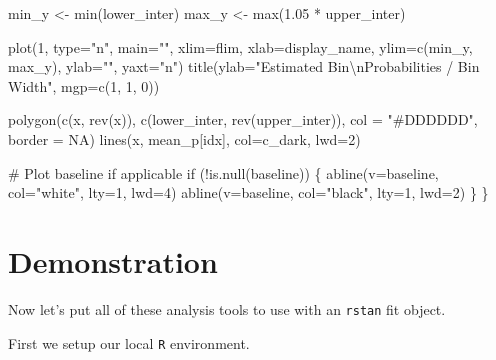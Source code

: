 \documentclass[
  letterpaper,
  DIV=11,
  numbers=noendperiod]{scrartcl}
\newenvironment{Shaded}{\begin{snugshade}}{\end{snugshade}}
\newcommand{\BuiltInTok}[1]{\textcolor[rgb]{0.00,0.23,0.31}{#1}}
\newcommand{\CharTok}[1]{\textcolor[rgb]{0.13,0.47,0.30}{#1}}
\newcommand{\CommentTok}[1]{\textcolor[rgb]{0.37,0.37,0.37}{#1}}
\newcommand{\ControlFlowTok}[1]{\textcolor[rgb]{0.00,0.23,0.31}{#1}}
\newcommand{\DecValTok}[1]{\textcolor[rgb]{0.68,0.00,0.00}{#1}}
\newcommand{\FloatTok}[1]{\textcolor[rgb]{0.68,0.00,0.00}{#1}}
\newcommand{\KeywordTok}[1]{\textcolor[rgb]{0.00,0.23,0.31}{#1}}
\newcommand{\NormalTok}[1]{\textcolor[rgb]{0.00,0.23,0.31}{#1}}
\newcommand{\OperatorTok}[1]{\textcolor[rgb]{0.37,0.37,0.37}{#1}}
\newcommand{\StringTok}[1]{\textcolor[rgb]{0.13,0.47,0.30}{#1}}
\begin{document}
\begin{Shaded}
\begin{Highlighting}[]
\NormalTok{  min\_y }\OperatorTok{\textless{}{-}} \BuiltInTok{min}\NormalTok{(lower\_inter)}
\NormalTok{  max\_y }\OperatorTok{\textless{}{-}} \BuiltInTok{max}\NormalTok{(}\FloatTok{1.05} \OperatorTok{*}\NormalTok{ upper\_inter)}
  
\NormalTok{  plot(}\DecValTok{1}\NormalTok{, }\BuiltInTok{type}\OperatorTok{=}\StringTok{"n"}\NormalTok{, main}\OperatorTok{=}\StringTok{""}\NormalTok{,}
\NormalTok{       xlim}\OperatorTok{=}\NormalTok{flim, xlab}\OperatorTok{=}\NormalTok{display\_name,}
\NormalTok{       ylim}\OperatorTok{=}\NormalTok{c(min\_y, max\_y), ylab}\OperatorTok{=}\StringTok{""}\NormalTok{, yaxt}\OperatorTok{=}\StringTok{"n"}\NormalTok{)}
\NormalTok{  title(ylab}\OperatorTok{=}\StringTok{"Estimated Bin}\CharTok{\textbackslash{}n}\StringTok{Probabilities / Bin Width"}\NormalTok{, mgp}\OperatorTok{=}\NormalTok{c(}\DecValTok{1}\NormalTok{, }\DecValTok{1}\NormalTok{, }\DecValTok{0}\NormalTok{))}
  
\NormalTok{  polygon(c(x, rev(x)), c(lower\_inter, rev(upper\_inter)),}
\NormalTok{          col }\OperatorTok{=} \StringTok{"\#DDDDDD"}\NormalTok{, border }\OperatorTok{=}\NormalTok{ NA)}
\NormalTok{  lines(x, mean\_p[idx], col}\OperatorTok{=}\NormalTok{c\_dark, lwd}\OperatorTok{=}\DecValTok{2}\NormalTok{)}
  
  \CommentTok{\# Plot baseline if applicable}
  \ControlFlowTok{if}\NormalTok{ (}\OperatorTok{!}\KeywordTok{is}\NormalTok{.null(baseline)) \{}
\NormalTok{    abline(v}\OperatorTok{=}\NormalTok{baseline, col}\OperatorTok{=}\StringTok{"white"}\NormalTok{, lty}\OperatorTok{=}\DecValTok{1}\NormalTok{, lwd}\OperatorTok{=}\DecValTok{4}\NormalTok{)}
\NormalTok{    abline(v}\OperatorTok{=}\NormalTok{baseline, col}\OperatorTok{=}\StringTok{"black"}\NormalTok{, lty}\OperatorTok{=}\DecValTok{1}\NormalTok{, lwd}\OperatorTok{=}\DecValTok{2}\NormalTok{)}
\NormalTok{  \}}
\NormalTok{\}}
\end{Highlighting}
\end{Shaded}

\hypertarget{demonstration}{%
\section{Demonstration}\label{demonstration}}

Now let's put all of these analysis tools to use with an \texttt{rstan}
fit object.

First we setup our local \texttt{R} environment.
\end{document}

